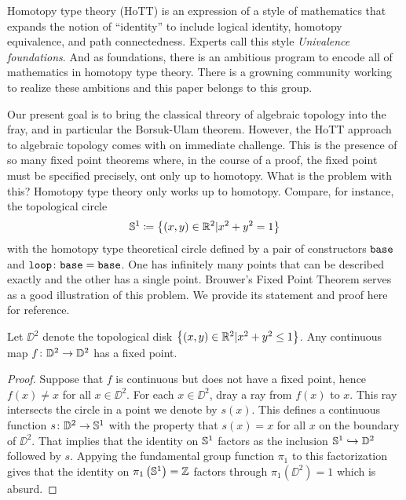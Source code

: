 \documentclass{amsart}
\begin{document}
Homotopy type theory (HoTT) is an expression of a style of
mathematics that expands the notion of ``identity'' to
include logical identity, homotopy equivalence, and path
connectedness.  Experts call this style \emph{Univalence
  foundations}. And as foundations, there is an ambitious
program to encode all of mathematics in homotopy type
theory. There is a growning community working to realize
these ambitions and this paper belongs to this group.

Our present goal is to bring the classical threory of
algebraic topology into the fray, and in particular the
Borsuk-Ulam theorem.  However, the HoTT approach to
algebraic topology comes with on immediate challenge. This
is the presence of so many fixed point theorems where, in
the course of a proof, the fixed point must be specified
precisely, ont only up to homotopy.  What is the problem
with this?  Homotopy type theory only works up to
homotopy. Compare, for instance, the topological circle
\[ \mathbb{S}^1 \coloneqq \left\{ (x,y) \in \mathbb{R}^2 | x^2 + y^2 = 1
    \right\} \] with the homotopy type theoretical circle
defined by a pair of constructors $ \mathtt{base} $ and
$ \mathtt{loop} \colon \mathtt{base} = \mathtt{base}$. One has
infinitely many points that can be described exactly and the
other has a single point. Brouwer's Fixed Point Theorem
serves as a good illustration of this problem. We provide
its statement and proof here for reference.

\begin{theorem}
  Let $ \DD^2 $ denote the topological disk $ \left\{ (x,y)
      \in \mathbb{R}^2 | x^2 + y^2 \leq 1 \right\} $.  Any
  continuous map $ f \colon \mathbb{D}^2 \to \mathbb{D}^2 $ has a fixed point.
\end{theorem}

\begin{proof}
  Suppose that $ f $ is continuous but does not have a fixed
  point, hence $ f(x) \neq x $ for all $ x \in \DD^2 $.
  For each $ x \in \DD^2 $, dray a ray from $ f(x) $ to $ x
  $. This ray intersects the circle in a point we denote by
  $ s(x) $. This defines a continuous function $ s \colon
  \mathbb{D}^2 \to \mathbb{S}^1 $ with the property that $ s(x)=x $ for all $ x $ on
  the boundary of $ \DD^2 $.  That implies that the identity
  on $ \mathbb{S}^1 $ factors as the inclusion $ \mathbb{S}^1
  \hookrightarrow \mathbb{D}^2 $ followed by $ s $.  Appying the
  fundamental group function $ \pi_1 $ to this factorization
  gives that the identity on $ \pi_1 \left( \mathbb{S}^1 \right) =
  \mathbb{Z} $ factors through $ \pi_1 \left( \DD^2 \right) = 1 $
  which is absurd.
\end{proof}
\end{document}
